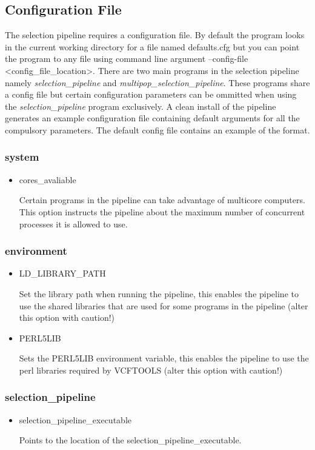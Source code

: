 \documentclass[a4paper,10pt]{article}
\begin{document}
\subsection{Configuration File}
The selection pipeline requires a configuration file. By default the
program looks in the current working directory for a file named
defaults.cfg but you can point the program to any file using command
line argument --config-file <config\_file\_location>. There are two
main programs in the selection pipeline namely
\emph{selection\_pipeline} and \emph{multipop\_selection_pipeline}. These
programs share a config file but certain configuration parameters can
be ommitted when using the \emph{selection\_pipeline} program
exclusively. A clean install of the pipeline generates an example
configuration file containing default arguments for all the compulsory
parameters. The default config file contains an example of the format.
\subsubsection{system}
\begin{itemize}
\item cores\_avaliable

Certain programs in the pipeline can take advantage of multicore
computers. This option instructs the pipeline about the maximum number
of concurrent processes it is allowed to use.
\end{itemize}
\subsubsection{environment}
\begin{itemize}
\item LD\_LIBRARY\_PATH

Set the library path when running the pipeline, this enables the
pipeline to use the shared libraries that are used for some programs
in the pipeline (alter this option with caution!)

\item PERL5LIB

Sets the PERL5LIB environment variable, this enables the pipeline to
use the perl libraries required by VCFTOOLS (alter this option with
caution!)

\end{itemize}
\subsubsection{selection\_pipeline}
\begin{itemize}
\item selection\_pipeline\_executable

Points to the location of the selection\_pipeline\_executable. 
\end{itemize}
\end{document}
